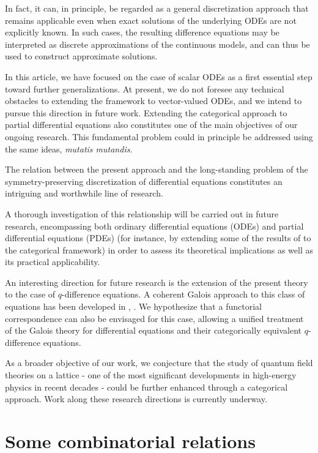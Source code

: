 \documentclass[10pt]{amsart}
\numberwithin{equation}{section}
\theoremstyle{definition}
\begin{document}
In fact, it can, in principle, be regarded as a general discretization
approach that remains applicable even when exact solutions of the underlying
ODEs are not explicitly known. In such cases, the resulting difference
equations may be interpreted as discrete approximations of the continuous
models, and can thus be used to construct approximate solutions.

In this article, we have focused on the case of scalar ODEs as a first
essential step toward further generalizations. At present, we do not foresee
any technical obstacles to extending the framework to vector-valued ODEs,
and we intend to pursue this direction in future work. Extending the categorical
approach to partial differential equations also constitutes one of the
main objectives of our ongoing research. This fundamental problem could
in principle be addressed using the same ideas,
\textit{mutatis mutandis}.

The relation between the present approach and the long-standing problem
of the symmetry-preserving discretization of differential equations constitutes
an intriguing and worthwhile line of research.

A thorough investigation of this relationship will be carried out in future
research, encompassing both ordinary differential equations (ODEs) and
partial differential equations (PDEs) (for instance, by extending some of the results of \cite{Tempesta2} to the categorical framework) in order to assess its theoretical
implications as well as its practical applicability.

An interesting direction for future research is the extension of the present
theory to the case of $q$-difference equations. A coherent Galois approach
to this class of equations has been developed in \cite{diV},
\cite{Sauloy}. We hypothesize that a functorial correspondence can also
be envisaged for this case, allowing a unified treatment of the Galois
theory for differential equations and their categorically equivalent
$q$-difference equations.

As a broader objective of our work, we conjecture that the study of quantum
field theories on a lattice - one of the most significant developments
in high-energy physics in recent decades - could be further enhanced through
a categorical approach. Work along these research directions is currently
underway.


\appendix
\section{Some combinatorial relations}
\end{document}
